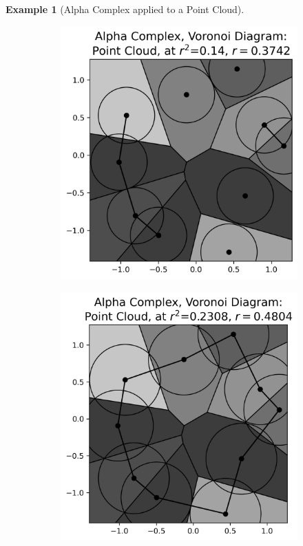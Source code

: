 \documentclass[ma]{uncgdissertationexp}
\theoremstyle{plain}
\theoremstyle{definition}
\newtheorem{example}[theorem]{Example}
\theoremstyle{remark}
\begin{document}
\begin{example}[Alpha Complex applied to a Point Cloud]
\begin{figure}[H]
\begin{subfigure}[b]{0.28\textwidth}
        \includegraphics[width=\textwidth]{point_cloud_plot_alpha_1.png}
    \end{subfigure}
    \hfill
    \begin{subfigure}[b]{0.28\textwidth}
        \includegraphics[width=\textwidth]{point_cloud_plot_alpha_2.png}

\end{subfigure}
\end{figure}
\end{example}
\end{document}
